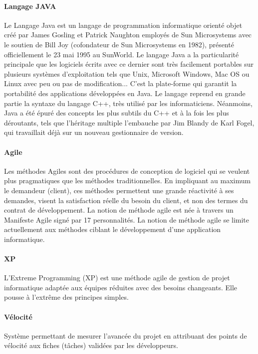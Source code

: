 \paragraph{Langage JAVA}
Le Langage Java est un langage de programmation informatique orienté objet créé par James Gosling et Patrick Naughton employés de Sun Microsystems avec le soutien de Bill Joy (cofondateur de Sun Microsystems en 1982), présenté officiellement le 23 mai 1995 au SunWorld. Le langage Java a la particularité principale que les logiciels écrits avec ce dernier sont très facilement portables sur plusieurs systèmes d'exploitation tels que Unix, Microsoft Windows, Mac OS ou Linux avec peu ou pas de modification... C'est la plate-forme qui garantit la portabilité des applications développées en Java. Le langage reprend en grande partie la syntaxe du langage C++, très utilisé par les informaticiens. Néanmoins, Java a été épuré des concepts les plus subtils du C++ et à la fois les plus déroutants, tels que l'héritage multiple 	 l'embauche par Jim Blandy de Karl Fogel, qui travaillait déjà sur un nouveau gestionnaire de version. 

\paragraph{Agile}
Les méthodes Agiles sont des procédures de conception de logiciel qui se veulent plus pragmatiques que les méthodes traditionnelles. En impliquant au maximum le demandeur (client), ces méthodes permettent une grande réactivité à ses demandes, visent la satisfaction réelle du besoin du client, et non des termes du contrat de développement. La notion de méthode agile est née à travers un Manifeste Agile signé par 17 personnalités. La notion de méthode agile se limite actuellement aux méthodes ciblant le développement d'une application informatique.

\paragraph{XP}
L'Extreme Programming (XP) est une méthode agile de gestion de projet informatique adaptée aux équipes réduites avec des besoins changeants. Elle pousse à l'extrême des principes simples. 

\paragraph{Vélocité}
Système permettant de mesurer l'avancée du projet en attribuant des points de vélocité aux fiches (tâches) validées par les développeurs.

